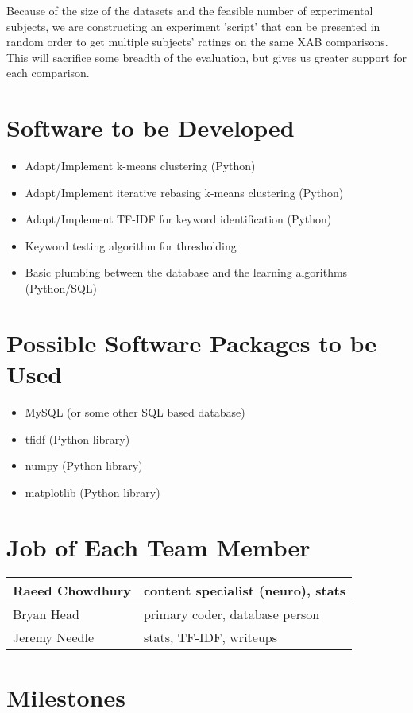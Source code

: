 \documentclass{acm_proc_article-sp}
\begin{document}
Because of the size of the datasets and the feasible number of experimental subjects, we are constructing an experiment 'script' that can be presented in random order to get multiple subjects' ratings on the same XAB comparisons. This will sacrifice some breadth of the evaluation, but gives us greater support for each comparison.

\section{Software to be Developed}
\begin{itemize}
	\item Adapt/Implement k-means clustering (Python)
	\item Adapt/Implement iterative rebasing k-means clustering (Python)
	\item Adapt/Implement TF-IDF for keyword identification (Python)
	\item Keyword testing algorithm for thresholding
	\item Basic plumbing between the database and the learning algorithms (Python/SQL)
\end{itemize}

\section{Possible Software Packages to be Used}
\begin{itemize}
	\item MySQL (or some other SQL based database)
	\item tfidf (Python library)
	\item numpy (Python library)
	\item matplotlib (Python library)
\end{itemize}

\section{Job of Each Team Member}
\begin{tabular}{|l|l|}
	\hline
	Raeed Chowdhury & content specialist (neuro), stats\\
	\hline
	Bryan Head & primary coder, database person\\
	\hline
	Jeremy Needle & stats, TF-IDF, writeups\\
	\hline
\end{tabular}

\section{Milestones}
\end{document}

